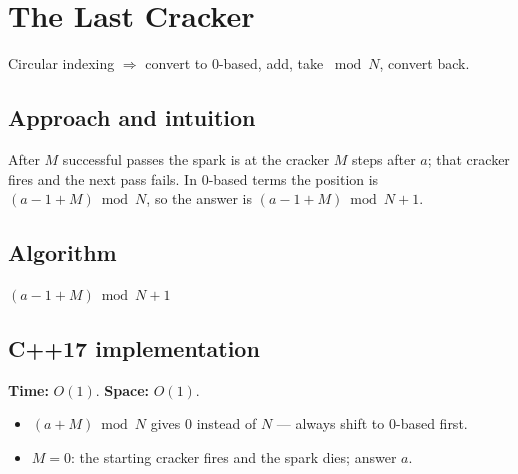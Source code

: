 \section{The Last Cracker}
\label{sec:n-last-cracker}


\begin{patternbox}
Circular indexing $\Rightarrow$ convert to $0$-based, add, take $\bmod N$,
convert back.
\end{patternbox}

\subsection*{Approach and intuition}

After $M$ successful passes the spark is at the cracker $M$ steps after $a$;
that cracker fires and the next pass fails. In $0$-based terms the position is
$(a-1+M)\bmod N$, so the answer is $(a-1+M)\bmod N+1$.

\subsection*{Algorithm}
\begin{algorithmic}[1]
\State \Return $(a-1+M)\bmod N+1$
\end{algorithmic}


\subsection*{C++17 implementation}

\begin{complexitybox}
\textbf{Time:} $O(1)$. \textbf{Space:} $O(1)$.
\end{complexitybox}

\begin{pitfallbox}
\begin{itemize}
  \item $(a+M)\bmod N$ gives $0$ instead of $N$ --- always shift to $0$-based
        first.
  \item $M=0$: the starting cracker fires and the spark dies; answer $a$.
\end{itemize}
\end{pitfallbox}

